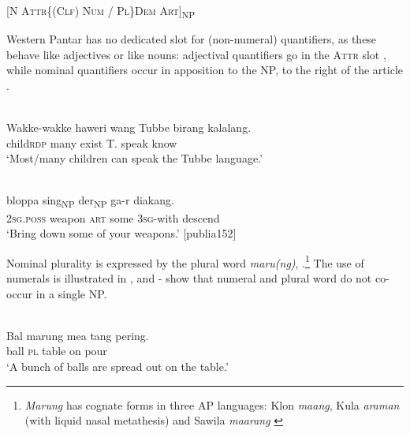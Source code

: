  [\textsc{N  Attr\{(Clf) Num / Pl\}Dem  Art]}\textsc{\textsubscript{\upshape NP}}
 
\z


Western Pantar has no dedicated slot for (non-numeral) quantifiers, as these behave like adjectives or like nouns: adjectival quantifiers go in the A\textsc{ttr} slot , while nominal quantifiers occur in apposition to the NP, to the right of the article .



\ea%
\label{ex:9:13}
 \\
\gll  Wakke-wakke haweri wang Tubbe birang kalalang. \\
   child{\Tilde}\textsc{rdp} many exist T. speak know  \\
\glt `Most/many children can speak the Tubbe language.'
\z







\ea%
\label{ex:9:14}
 \\
 bloppa sing{\cb}\textsubscript{\upshape NP} {der}{\cb}\textsubscript{\upshape NP} ga-r diakang.  \\
  \textsc{2sg.poss} weapon \textsc{art} some 3\textsc{sg-}with descend  \\
\glt `Bring down some of your weapons.' [publia152]
\z






Nominal plurality is expressed by the plural word \textit{maru(ng)}, .\footnote{\textit{Marung} has cognate forms in three AP languages: Klon \textit{maang}, Kula \textit{araman} (with liquid nasal metathesis) and Sawila \textit{maarang} \citep{SchapperEtAlms}} The use of numerals is illustrated in , and - show that numeral and plural word do not co-occur in a single NP.


\ea%
\label{ex:9:15}
 \\
\gll  Bal  marung mea tang pering. \\
 ball \textsc{pl} table on pour   \\
\glt `A bunch of balls are spread out on the table.'
\z







